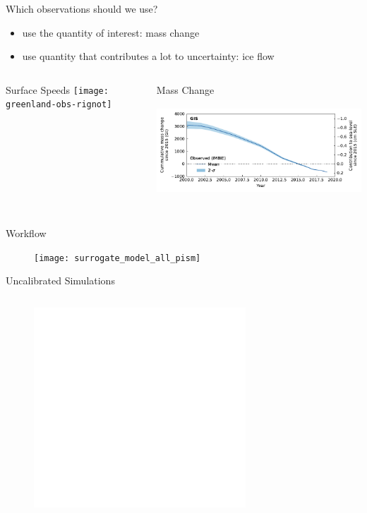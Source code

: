 \documentclass[aspectratio=169,hide notes,intlimits]{beamer}
\begin{document}
\begin{frame}{Which observations should we use?}
    \begin{minipage}[t][1.2cm][t]{\textwidth}
        \begin{itemize}
        \item use the quantity of interest: \alert{mass change}
        \item use quantity that contributes a lot to uncertainty: \alert{ice flow}
        \end{itemize}
  \end{minipage}
    \begin{minipage}[t][10cm][t]{\textwidth}
        \begin{columns}[c]
    \begin{column}{.3\textwidth}
   \begin{block}{Surface Speeds}
    \texttt{[image: greenland-obs-rignot]}
    \end{block}
    \end{column}
    \begin{column}{.65\textwidth}
   \begin{block}{Mass Change}
    \includegraphics[height=4cm]{GIS_hist_only_obs}
    \end{block}
    \end{column}
  \end{columns}
    \end{minipage}
\end{frame}


\begin{frame}{Workflow}
  \vspace{-1.5em}
    \begin{minipage}[t][7.25cm][t]{\textwidth}
    \begin{figure}
      \texttt{[image: surrogate\_model\_all\_pism]}
    \end{figure}
    \end{minipage}
\end{frame}


\begin{frame}{Uncalibrated Simulations}
\begin{columns}[c]
    \begin{column}{.5\textwidth}
      \begin{figure}
        \includegraphics<1>[height=7.5cm]{sle_pdf_w_obs_as19_2020.pdf}
    \end{figure}
    \end{column}
    \begin{column}{.5\textwidth}
    \end{column}
  \end{columns}

\end{frame}
\end{document}
